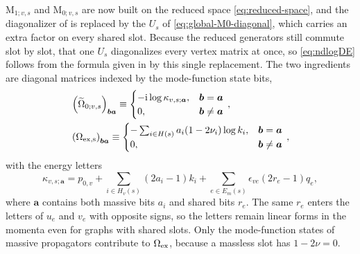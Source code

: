 \documentclass[11pt,a4paper]{article}
\numberwithin{table}{section}
\newcommand{\ii}{\mathrm i}
\def\ie{\begin{equation}\begin{aligned}}
\def\fe{\end{aligned}\end{equation}}
\begin{document}
$\text{M}_{1;v,s}$ and $\text{M}_{0;v,s}$ are now built on the reduced space
\eqref{eq:reduced-space}, and the diagonalizer of \cite{Chen:2023iix} is replaced by the $U_s$ of
\eqref{eq:global-M0-diagonal}, which carries an extra factor on every shared slot. Because the
reduced generators still commute slot by slot, that one $U_s$ diagonalizes every vertex matrix at
once, so \eqref{eq:ndlogDE} follows from the formula given in \cite{Chen:2023iix} by this single
replacement.
The two ingredients are diagonal matrices indexed by the mode-function state bits,
\ie \label{eq:omega-form}
&\left( \widetilde{\Omega}_{0;v,s} \right)_{\bm{b}\bm{a}}  \equiv \begin{cases} - \ii \log \kappa_{v,s;\bm{a}} , & \bm{b}=\bm{a} \\
0, & \bm{b}\neq \bm{a}
\end{cases} \, , \\
&\left( \Omega_{\rm ex,s} \right)_{\bm{b}\bm{a}}  \equiv \begin{cases} - \sum_{i\in H(s)} a_i(1-2\nu_i) \log k_i , & \bm{b}=\bm{a} \\
0, & \bm{b}\neq \bm{a}
\end{cases} \, ,
\fe
with the energy letters
\begin{equation}
  \kappa_{v,s;\bm a}=p_{0,v}
  +\sum_{i\in H_v(s)}(2a_i-1)k_i
  +\sum_{e\in E_m(s)}\epsilon_{ve}(2r_e-1)q_e,
  \label{eq:global-energy-letter}
\end{equation}
where $\bm a$ contains both massive bits $a_i$ and shared bits $r_e$.
The same $r_e$ enters the letters of $u_e$ and $v_e$ with opposite signs, so the letters
remain linear forms in the momenta even for graphs with shared slots. Only the mode-function states of massive propagators contribute to
$\Omega_{\rm ex}$, because a massless slot has $1-2\nu=0$.
\end{document}
